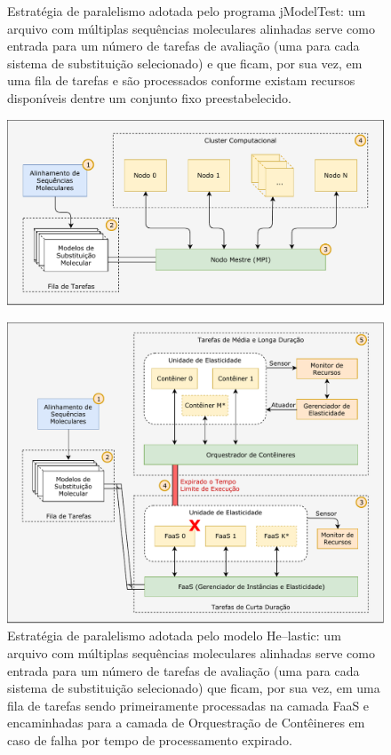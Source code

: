 \documentclass[english,brazilian]{UNISINOSmonografia} %
\begin{document}
\begin{figure}[p]
	\centering%
	\begin{minipage}{.75\textwidth}
		\caption{Estratégia de paralelismo adotada pelo programa jModelTest: um arquivo com múltiplas sequências moleculares alinhadas serve como entrada para um número de tarefas de avaliação (uma para cada sistema de substituição selecionado) e que ficam, por sua vez, em uma fila de tarefas e são processados conforme existam recursos disponíveis dentre um conjunto fixo preestabelecido.}
		\label{fig:modelo-jmodeltest}
		\vspace{1ex}
		\includegraphics[width=\textwidth]{modelo-jmodeltest}
	\end{minipage}
	\begin{minipage}{.75\textwidth}
		\caption{Estratégia de paralelismo adotada pelo modelo \textsf{He}--lastic: um arquivo com múltiplas sequências moleculares alinhadas serve como entrada para um número de tarefas de avaliação (uma para cada sistema de substituição selecionado) que ficam, por sua vez, em uma fila de tarefas sendo primeiramente processadas na camada FaaS e encaminhadas para a camada de Orquestração de Contêineres em caso de falha por tempo de processamento expirado.}
		\label{fig:modelo-strategies}
		\vspace{1ex}
		\includegraphics[width=\textwidth]{modelo-strategies}
	\end{minipage}
\end{figure}
\end{document}
